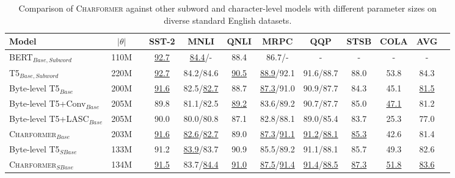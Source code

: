 \documentclass{article} \usepackage{iclr2022_conference,times}
\newcommand{\charformer}{\textsc{Charformer}\xspace}
\newcommand{\charformerbase}{\textsc{Charformer}$_{Base}$\xspace}
\newcommand{\charformertall}{\textsc{Charformer}$_{SBase}$\xspace}
\newcommand{\bytebase}{Byte-level T5$_{Base}$\xspace}
\newcommand{\caninebase}{Byte-level T5+LASC$_{Base}$\xspace}
\newcommand{\convbase}{Byte-level T5+Conv$_{Base}$\xspace}
\begin{document}
\begin{table}
    \caption{Comparison of \charformer against other subword and character-level models with different parameter sizes on diverse standard English datasets.}
    \label{tab:glue}
    \begin{adjustbox}{width=\columnwidth,center}
    \centering
    \begin{tabular}{l c c ccccc cc cc}
    \toprule
        Model & $|\theta|$ & &SST-2 & MNLI & QNLI & MRPC & QQP &
        STSB & COLA & AVG  \\
        \midrule
        BERT$_{Base, Subword}$ & 110M & & \underline{92.7} & \underline{84.4}/- & 88.4 & 86.7/- & - & - & - & -\\
T5$_{Base, Subword}$ & 220M & & \underline{92.7}  & 84.2/84.6 & \underline{90.5} & \underline{88.9}/92.1 & 91.6/88.7  & 88.0 &53.8 & 84.3\\
        \cmidrule{1-11}


 
\bytebase & 200M&  & \underline{91.6} & 82.5/\underline{82.7} & 88.7 & \underline{87.3}/91.0 & 90.9/87.7 & 84.3 & 45.1 & \underline{81.5}\\ 
        \convbase & 205M  & & 89.8 & 81.1/82.5 & \underline{89.2} & 83.6/89.2 & 90.7/87.7 & 85.0 & \underline{47.1} & 81.2 \\
        \caninebase & 205M& & 90.0 & 80.0/80.8 & 87.1 & 82.8/88.1& 89.0/85.4 & 83.7 & 25.3 & 77.0\\
        \charformerbase &203M&  & \underline{91.6} & \underline{82.6}/\underline{82.7} & 89.0 & \underline{87.3}/\underline{91.1} & \underline{91.2}/\underline{88.1} & \underline{85.3}  & 42.6 & 81.4 \\
        \cmidrule{1-11}
        Byte-level T5$_{SBase}$ & 133M & &91.2 & \underline{83.9}/83.7 & 90.9 & 85.5/89.2 &91.1/88.1 & 85.7 & 49.3 & 82.6\\
        \charformertall & 134M &  & \underline{91.5} & {83.7}/\underline{84.4} & \underline{91.0}  & 
        \underline{87.5}/\underline{91.4} & \underline{91.4}/\underline{88.5} & \underline{87.3} & \underline{51.8} & \underline{83.6}\\
        \bottomrule
    \end{tabular}
    \end{adjustbox}
\end{table}
\end{document}
